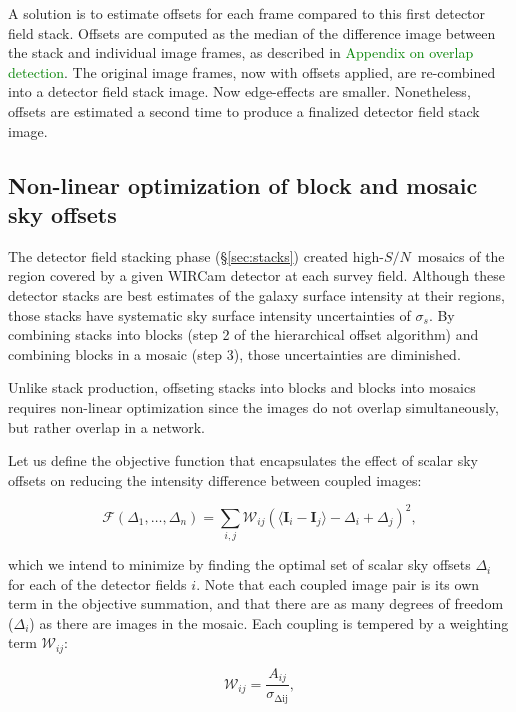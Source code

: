 \documentclass[iop]{emulateapj}
\newcommand{\vect}[1]{\boldsymbol{#1}} %
\newcommand{\sn}{\ensuremath{S/N}} %
\newcommand{\todo}[1]{\textcolor{green}{#1}}
\begin{document}
A solution is to estimate offsets for each frame compared to this first detector field stack. Offsets are computed as the median of the difference image between the stack and individual image frames, as described in \todo{Appendix on overlap detection}. The original image frames, now with offsets applied, are re-combined into a detector field stack image. Now edge-effects are smaller. Nonetheless, offsets are estimated a second time to produce a finalized detector field stack image.

\subsection{Non-linear optimization of block and mosaic sky offsets}

The detector field stacking phase (\S \ref{sec:stacks}) created high-\sn\ mosaics of the region covered by a given WIRCam detector at each survey field. Although these detector stacks are best estimates of the galaxy surface intensity at their regions, those stacks have systematic sky surface intensity uncertainties of $\sigma_s$. By combining stacks into blocks (step 2 of the hierarchical offset algorithm) and combining blocks in a mosaic (step 3), those uncertainties are diminished.

Unlike stack production, offseting stacks into blocks and blocks into mosaics requires non-linear optimization since the images do not overlap simultaneously, but rather overlap in a network.

Let us define the objective function that encapsulates the effect of scalar sky offsets on reducing the intensity difference between coupled images:

\begin{equation}
    \mathcal{F} \left(\Delta_1,\ldots,\Delta_n \right) = \sum_{i,j} \mathcal{W}_{ij} \left( \langle \vect{I}_i - \vect{I}_j \rangle - \Delta_i + \Delta_j \right)^2,
    \label{eq:objf}
\end{equation}

\noindent which we intend to minimize by finding the optimal set of scalar sky offsets $\Delta_i$ for each of the detector fields $i$. Note that each coupled image pair is its own term in the objective summation, and that there are as many degrees of freedom ($\Delta_i$) as there are images in the mosaic. Each coupling is tempered by a weighting term $\mathcal{W}_{ij}$:

\begin{equation}
    \mathcal{W}_{ij} = \frac{A_{ij}}{\sigma_{\mathrm{\Delta ij}}},
\end{equation}
\end{document}
